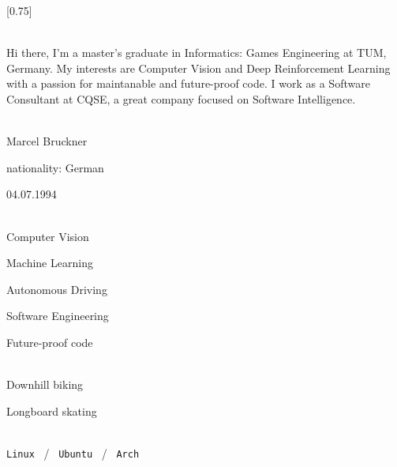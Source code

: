 \documentclass[lighthipster]{simplehipstercv}
\begin{document}
\setlength{\columnsep}{1.5cm}
[0.75]
\begin{paracol}{2}

    \paracolbackgroundoptions



    \footnotesize
    {\setasidefontcolour
    \flushright
    \begin{center}
    \end{center}

    \\[0.5em]

    {\footnotesize
    Hi there, I'm a master's graduate in Informatics: Games Engineering at TUM, Germany. My interests are Computer Vision and Deep Reinforcement Learning with a passion for maintanable and future-proof code. I work as a Software Consultant at CQSE, a great company focused on Software Intelligence.
    }
    \bigskip

     \\[0.5em]
    Marcel Bruckner

    nationality: German

    04.07.1994

    \bigskip

     \\[0.5em]
    Computer Vision

    Machine Learning

    Autonomous Driving

    Software Engineering

    Future-proof code

    \bigskip

    \bigskip

    \\[0.5em]

    Downhill biking

    Longboard skating

    \bigskip

    \\[0.5em]

    \texttt{Linux} ~/~ \texttt{Ubuntu} ~/~ \texttt{Arch}

}
\end{paracol}
\end{document}
